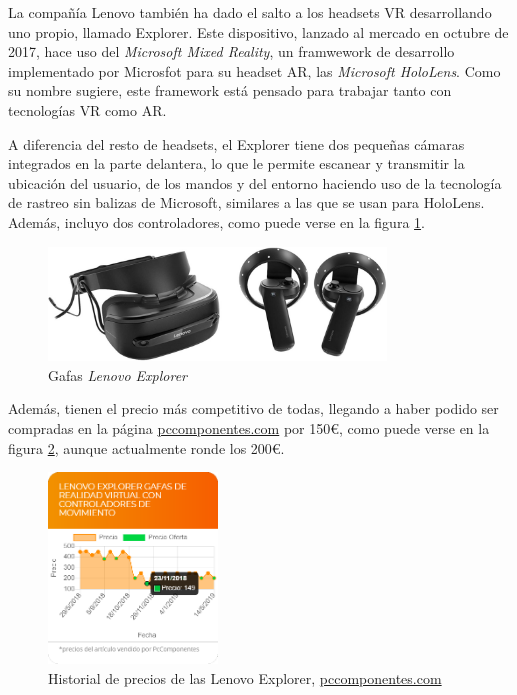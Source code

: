 La compañía Lenovo también ha dado el salto a los headsets \acs{VR} desarrollando uno propio, llamado Explorer. Este dispositivo, lanzado al mercado en octubre de 2017, hace uso del \textit{Microsoft Mixed Reality}, un framwework de desarrollo implementado por Microsfot para su headset \acs{AR}, las \textit{Microsoft HoloLens}. Como su nombre sugiere, este framework está pensado para trabajar tanto con tecnologías \acs{VR} como \acs{AR}.
    
A diferencia del resto de headsets, el Explorer tiene dos pequeñas cámaras integrados en la parte delantera, lo que le permite escanear y transmitir la ubicación del usuario, de los mandos y del entorno haciendo uso de la tecnología de rastreo sin balizas de Microsoft, similares a las que se usan para HoloLens. Además, incluyo dos controladores, como puede verse en la figura \ref{fig:lenovo-explorer}.

\begin{figure}[!h]
\begin{center}
\includegraphics[width=0.8\textwidth]{imagenes/2/lenovo-explorer.jpg}
\caption{Gafas \textit{Lenovo Explorer}}
\label{fig:lenovo-explorer}
\end{center}
\end{figure}

Además, tienen el precio más competitivo de todas, llegando a haber podido ser compradas en la página \url{pccomponentes.com} por 150\euro, como puede verse en la figura \ref{fig:precios-explorer}, aunque actualmente ronde los 200\euro. 

\begin{figure}[!h]
\begin{center}
    \includegraphics[width=0.4\textwidth]{imagenes/2/precios-explorer.png}
    \caption{Historial de precios de las Lenovo Explorer, \url{pccomponentes.com}}
    \label{fig:precios-explorer}
\end{center}
\end{figure}

